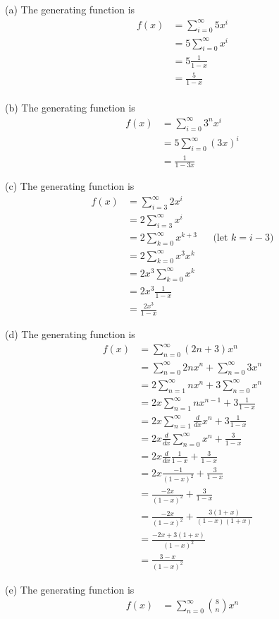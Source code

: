 
(a)
The generating function is
\begin{align*}
  f(x) &= \sum_{i=0}^\infty 5x^i \\
  &= 5 \sum_{i=0}^\infty x^i \\
  &= 5 \frac{1}{1 - x} \\
  &= \frac{5}{1 - x} \\
\end{align*}

(b)
The generating function is
\begin{align*}
  f(x) &= \sum_{i=0}^\infty 3^nx^i \\
  &= 5 \sum_{i=0}^\infty (3x)^i \\
  &= \frac{1}{1 - 3x} 
\end{align*}

(c)
The generating function is
\begin{align*}
  f(x) &= \sum_{i=3}^\infty 2x^i \\
  &= 2 \sum_{i=3}^\infty x^i \\
  &= 2 \sum_{k=0}^\infty x^{k+3} & & \text{(let $k = i - 3$)} \\
  &= 2 \sum_{k=0}^\infty x^3x^{k} \\
  &= 2x^3 \sum_{k=0}^\infty x^{k} \\
  &= 2x^3 \frac{1}{1 - x} \\
  &= \frac{2x^3}{1 - x} 
\end{align*}


(d)
The generating function is
\begin{align*}
  f(x) &= \sum_{n=0}^\infty (2n + 3) x^n \\
  &= \sum_{n=0}^\infty 2n x^n + \sum_{n=0}^\infty 3 x^n \\
  &= 2 \sum_{n=1}^\infty n x^n + 3 \sum_{n=0}^\infty x^n \\
  &= 2x \sum_{n=1}^\infty n x^{n-1} + 3 \frac{1}{1 - x} \\
  &= 2x \sum_{n=1}^\infty \frac{d}{dx} x^{n} + 3 \frac{1}{1 - x} \\
  &= 2x \frac{d}{dx} \sum_{n=0}^\infty x^{n} + \frac{3}{1 - x} \\
  &= 2x \frac{d}{dx} \frac{1}{1 - x} + \frac{3}{1 - x} \\
  &= 2x \frac{-1}{(1 - x)^2} + \frac{3}{1 - x} \\
  &= \frac{-2x}{(1 - x)^2} + \frac{3}{1 - x} \\
  &= \frac{-2x}{(1 - x)^2} + \frac{3(1 + x)}{(1 - x)(1 + x)} \\
  &= \frac{-2x + 3(1 + x)}{(1 - x)^2} \\
  &= \frac{3 - x}{(1 - x)^2} 
\end{align*}


(e)
The generating function is
\begin{align*}
  f(x) &= \sum_{n=0}^\infty \binom{8}{n} x^n \\
\end{align*}
